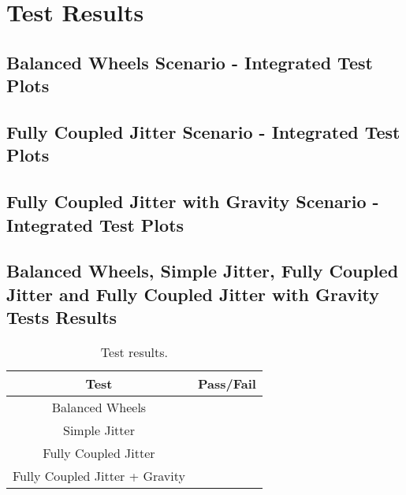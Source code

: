 \clearpage

\section{Test Results}

\subsection{Balanced Wheels Scenario - Integrated Test Plots}






\clearpage

\subsection{Fully Coupled Jitter Scenario - Integrated Test Plots}






\clearpage

\subsection{Fully Coupled Jitter with Gravity Scenario - Integrated Test Plots}





\clearpage

\subsection{Balanced Wheels, Simple Jitter, Fully Coupled Jitter and Fully Coupled Jitter with Gravity Tests Results}

\begin{table}[htbp]
	\caption{Test results.}
	\label{tab:results}
	\centering \fontsize{10}{10}\selectfont
	\begin{tabular}{c | c } %
		\hline
		\textbf{Test} 				    & \textbf{Pass/Fail}  \\ \hline
		Balanced Wheels  &  \\
		Simple Jitter  &    \\ 
		Fully Coupled Jitter &   \\ 
		Fully Coupled Jitter + Gravity  &   \\ \hline
	\end{tabular}
\end{table}

\clearpage
